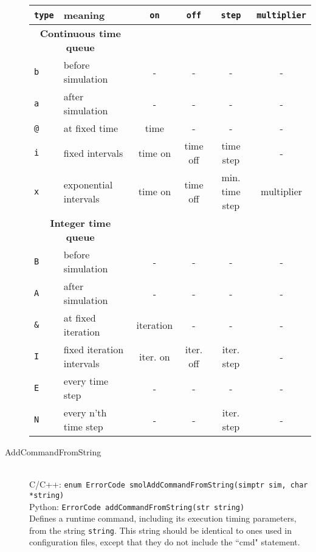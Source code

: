 \documentclass {scrbook}
\newcommand {\ttt} {\texttt}
\begin{document}
\begin{description}
\begin{longtable}[c]{ll|cccc}
\ttt{type} & meaning & \ttt{on} & \ttt{off} & \ttt{step} & \ttt{multiplier}\\
\hline
\multicolumn{2}{c}{\textbf{Continuous time queue}}\\
\ttt{b} & before simulation & - & - & - & -\\
\ttt{a} & after simulation & - & - & - & -\\
\ttt{@} & at fixed time & time & - & - & -\\
\ttt{i} & fixed intervals & time on & time off & time step & -\\
\ttt{x} & exponential intervals & time on & time off & min. time step & multiplier\\
\hline
\multicolumn{2}{c}{\textbf{Integer time queue}}\\
\ttt{B} & before simulation & - & - & - & -\\
\ttt{A} & after simulation & - & - & - & -\\
\ttt{\&} & at fixed iteration & iteration & - & - & -\\
\ttt{I} & fixed iteration intervals & iter. on & iter. off & iter. step & -\\
\ttt{E} & every time step & - & - & - & -\\
\ttt{N} & every n'th time step & - & - & iter. step & -\\
\end{longtable}

\item[AddCommandFromString]
\hfill \\
C/C++: \ttt{enum ErrorCode smolAddCommandFromString(simptr sim, char *string)}\\
Python: \ttt{ErrorCode addCommandFromString(str string)}\\
Defines a runtime command, including its execution timing parameters, from the string \ttt{string}. This string should be identical to ones used in configuration files, except that they do not include the ``cmd" statement.


\end{description}
\end{document}

